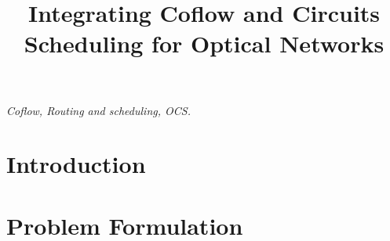 \documentclass[conference]{IEEEtran}[10pt]
\begin{document}
%
\title{Integrating Coflow and Circuits Scheduling for Optical Networks}


\author{ }

\maketitle
\begin{abstract}

\end{abstract}

\begin{IEEEkeywords}
\emph{Coflow, Routing and scheduling, OCS.}
\end{IEEEkeywords}
\begin{comment}

\author{\IEEEauthorblockN{Hongli Xu$^1$ \   Liusheng Huang$^1$}
\IEEEauthorblockA{Email:
xuhongli@ustc.edu.cn, lshuang@ustc.edu.cn\\
$^1$ School of Computer Science and Technology, University of
Science and Technology of China, China } }
\end{comment}


\section{Introduction}\label{sec:intro}



\section{Problem Formulation}\label{sec:prelim}

\end{document}
